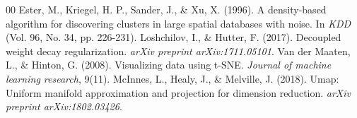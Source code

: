 \documentclass[conference]{IEEEtran}
\begin{document}
\begin{thebibliography}{00}
 Ester, M., Kriegel, H. P., Sander, J., \& Xu, X. (1996). A density-based algorithm for discovering clusters in large spatial databases with noise. In \textit{KDD} (Vol. 96, No. 34, pp. 226-231).
 Loshchilov, I., \& Hutter, F. (2017). Decoupled weight decay regularization. \textit{arXiv preprint arXiv:1711.05101}.
 Van der Maaten, L., \& Hinton, G. (2008). Visualizing data using t-SNE. \textit{Journal of machine learning research}, 9(11).
 McInnes, L., Healy, J., \& Melville, J. (2018). Umap: Uniform manifold approximation and projection for dimension reduction. \textit{arXiv preprint arXiv:1802.03426}.
\end{thebibliography}
\end{document}
